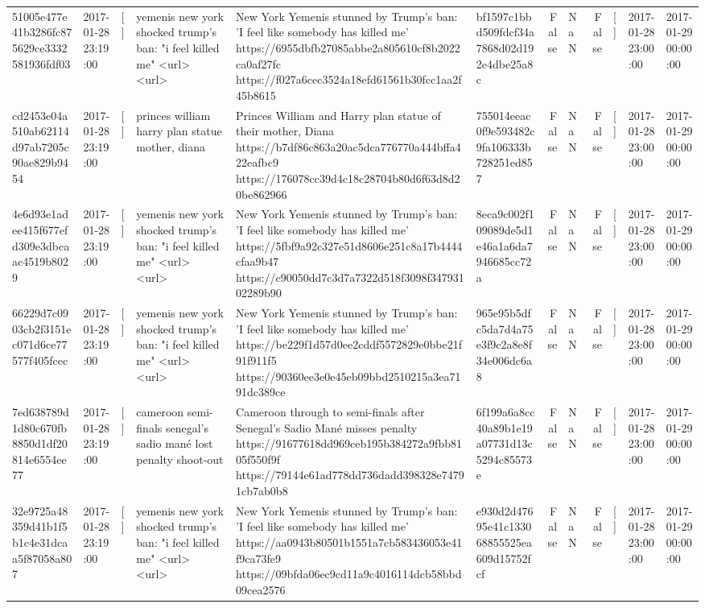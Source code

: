 \begin{tabular}{llllllrlrlll}
51005e477e41b3286fc875629ce3332581936fdf03 & 2017-01-28 23:19:00 & [] & yemenis new york shocked trump's ban: "i feel killed me" <url> <url> & New York Yemenis stunned by Trump's ban: 'I feel like somebody has killed me' https://6955dbfb27085abbe2a805610cf8b2022ca0af27fc https://f027a6cec3524a18efd61561b30fcc1aa2f45b8615 & bf1597c1bbd509fdcf34a7868d02d192e4dbe25a8c & False & NaN & False & [] & 2017-01-28 23:00:00 & 2017-01-29 00:00:00 \\
cd2453e04a510ab62114d97ab7205c90ae829b9454 & 2017-01-28 23:19:00 & [] & princes william harry plan statue mother, diana & Princes William and Harry plan statue of their mother, Diana https://b7df86c863a20ac5dca776770a444bffa422eafbc9 https://176078cc39d4c18c28704b80d6f63d8d20be862966 & 755014eeac0f9e593482c9fa106333b728251ed857 & False & NaN & False & [] & 2017-01-28 23:00:00 & 2017-01-29 00:00:00 \\
4e6d93e1adee415f677efd309e3dbcaac4519b8029 & 2017-01-28 23:19:00 & [] & yemenis new york shocked trump's ban: "i feel killed me" <url> <url> & New York Yemenis stunned by Trump's ban: 'I feel like somebody has killed me' https://5fbf9a92c327e51d8606e251c8a17b4444cfaa9b47 https://c90050dd7c3d7a7322d518f3098f34793102289b90 & 8eca9c002f109089de5d1e46a1a6da7946685cc72a & False & NaN & False & [] & 2017-01-28 23:00:00 & 2017-01-29 00:00:00 \\
66229d7c0903cb2f3151ec071d6ce77577f405fcec & 2017-01-28 23:19:00 & [] & yemenis new york shocked trump's ban: "i feel killed me" <url> <url> & New York Yemenis stunned by Trump's ban: 'I feel like somebody has killed me' https://be229f1d57d0ee2cddf5572829e0bbe21f91f911f5 https://90360ee3e0e45eb09bbd2510215a3ea7191dc389ce & 965e95b5dfc5da7d4a75e3f9c2a8e8f34e006dc6a8 & False & NaN & False & [] & 2017-01-28 23:00:00 & 2017-01-29 00:00:00 \\
7ed638789d1d80c670fb8850d1df20814e6554ee77 & 2017-01-28 23:19:00 & [] & cameroon semi-finals senegal's sadio mané lost penalty shoot-out & Cameroon through to semi-finals after Senegal’s Sadio Mané misses penalty https://91677618dd969ceb195b384272a9fbb8105f550f9f https://79144e61ad778dd736dadd398328e74791cb7ab0b8 & 6f199a6a8cc40a89b1e19a07731d13c5294c85573e & False & NaN & False & [] & 2017-01-28 23:00:00 & 2017-01-29 00:00:00 \\
32e9725a48359d41b1f5b1c4e31dcaa5f87058a807 & 2017-01-28 23:19:00 & [] & yemenis new york shocked trump's ban: "i feel killed me" <url> <url> & New York Yemenis stunned by Trump's ban: 'I feel like somebody has killed me' https://aa0943b80501b1551a7cb583436053e41f9ca73fe9 https://09bfda06ec9cd11a9c4016114dcb58bbd09cea2576 & e930d2d47695e41c133068855525ea609d15752fcf & False & NaN & False & [] & 2017-01-28 23:00:00 & 2017-01-29 00:00:00 \\

\end{tabular}
